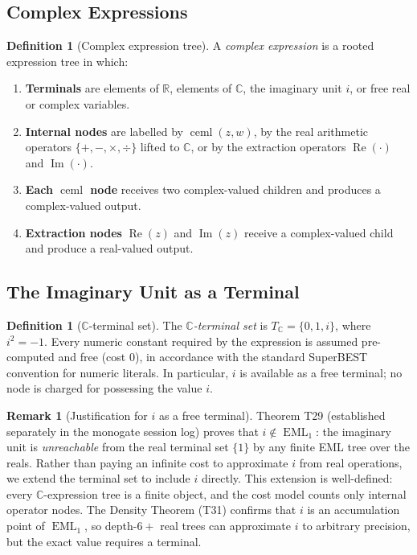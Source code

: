 \documentclass[12pt,a4paper]{article}
\theoremstyle{definition}
\newtheorem{definition}[theorem]{Definition}
\newtheorem{remark}[theorem]{Remark}
\newcommand{\EML}{\operatorname{EML}}
\newcommand{\ceml}{\operatorname{ceml}}
\begin{document}
\subsection{Complex Expressions}

\begin{definition}[Complex expression tree]
\label{def:complex-expr}
A \emph{complex expression} is a rooted expression tree in which:
\begin{enumerate}
  \item \textbf{Terminals} are elements of $\mathbb{R}$, elements of $\mathbb{C}$,
        the imaginary unit $i$, or free real or complex variables.
  \item \textbf{Internal nodes} are labelled by $\ceml(z,w)$, by the real
        arithmetic operators $\{+, -, \times, \div\}$ lifted to $\mathbb{C}$,
        or by the extraction operators $\operatorname{Re}(\cdot)$ and
        $\operatorname{Im}(\cdot)$.
  \item \textbf{Each $\ceml$ node} receives two complex-valued children and
        produces a complex-valued output.
  \item \textbf{Extraction nodes} $\operatorname{Re}(z)$ and $\operatorname{Im}(z)$
        receive a complex-valued child and produce a real-valued output.
\end{enumerate}
\end{definition}

\subsection{The Imaginary Unit as a Terminal}

\begin{definition}[$\mathbb{C}$-terminal set]
\label{def:c-terminal}
The \emph{$\mathbb{C}$-terminal set} is $T_{\mathbb{C}} = \{0, 1, i\}$, where
$i^2 = -1$.
Every numeric constant required by the expression is assumed pre-computed and
free (cost 0), in accordance with the standard SuperBEST convention for numeric
literals.
In particular, $i$ is available as a free terminal; no node is charged for
possessing the value $i$.
\end{definition}

\begin{remark}[Justification for $i$ as a free terminal]
\label{rem:i-terminal}
Theorem T29 (established separately in the monogate session log) proves that
$i \notin \EML_1$: the imaginary unit is \emph{unreachable} from the real
terminal set $\{1\}$ by any finite EML tree over the reals.
Rather than paying an infinite cost to approximate $i$ from real operations,
we extend the terminal set to include $i$ directly.
This extension is well-defined: every $\mathbb{C}$-expression tree is a finite
object, and the cost model counts only internal operator nodes.
The Density Theorem (T31) confirms that $i$ is an accumulation point of
$\EML_1$, so depth-$6+$ real trees can approximate $i$ to arbitrary precision,
but the exact value requires a terminal.
\end{remark}
\end{document}
